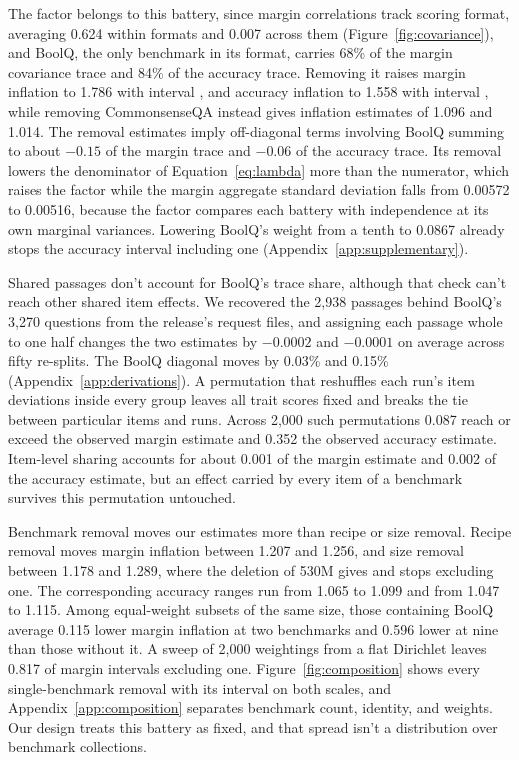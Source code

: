 The factor belongs to this battery, since margin correlations track scoring format, averaging 0.624 within formats and 0.007 across them (Figure~\ref{fig:covariance}), and BoolQ, the only benchmark in its format, carries 68\% of the margin covariance trace and 84\% of the accuracy trace. Removing it raises margin inflation to 1.786 with interval , and accuracy inflation to 1.558 with interval , while removing CommonsenseQA instead gives inflation estimates of 1.096 and 1.014. The removal estimates imply off-diagonal terms involving BoolQ summing to about $-0.15$ of the margin trace and $-0.06$ of the accuracy trace. Its removal lowers the denominator of Equation~\ref{eq:lambda} more than the numerator, which raises the factor while the margin aggregate standard deviation falls from 0.00572 to 0.00516, because the factor compares each battery with independence at its own marginal variances. Lowering BoolQ's weight from a tenth to 0.0867 already stops the accuracy interval including one (Appendix~\ref{app:supplementary}).

Shared passages don't account for BoolQ's trace share, although that check can't reach other shared item effects. We recovered the 2,938 passages behind BoolQ's 3,270 questions from the release's request files, and assigning each passage whole to one half changes the two estimates by $-0.0002$ and $-0.0001$ on average across fifty re-splits. The BoolQ diagonal moves by 0.03\% and 0.15\% (Appendix~\ref{app:derivations}). A permutation that reshuffles each run's item deviations inside every group leaves all trait scores fixed and breaks the tie between particular items and runs. Across 2,000 such permutations 0.087 reach or exceed the observed margin estimate and 0.352 the observed accuracy estimate. Item-level sharing accounts for about 0.001 of the margin estimate and 0.002 of the accuracy estimate, but an effect carried by every item of a benchmark survives this permutation untouched.

Benchmark removal moves our estimates more than recipe or size removal. Recipe removal moves margin inflation between 1.207 and 1.256, and size removal between 1.178 and 1.289, where the deletion of 530M gives  and stops excluding one. The corresponding accuracy ranges run from 1.065 to 1.099 and from 1.047 to 1.115. Among equal-weight subsets of the same size, those containing BoolQ average 0.115 lower margin inflation at two benchmarks and 0.596 lower at nine than those without it. A sweep of 2,000 weightings from a flat Dirichlet leaves 0.817 of margin intervals excluding one. Figure~\ref{fig:composition} shows every single-benchmark removal with its interval on both scales, and Appendix~\ref{app:composition} separates benchmark count, identity, and weights. Our design treats this battery as fixed, and that spread isn't a distribution over benchmark collections.

